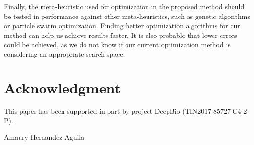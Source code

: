 ﻿\documentclass{ieeeaccess}
\begin{document}
Finally, the meta-heuristic used for optimization in the proposed method should be
tested in performance against other meta-heuristics, such as genetic
algorithms or particle swarm optimization. Finding better optimization
algorithms for our method can help us achieve results faster. It is
also probable that lower errors could be achieved, as we do not know
if our current optimization method is considering an appropriate
search space.










\section*{Acknowledgment}
This paper has been supported in part by project DeepBio (TIN2017-85727-C4-2-P).

\begin{IEEEbiography}{Amaury
  Hernandez-Aguila} 
\end{IEEEbiography}




\EOD
\end{document}
